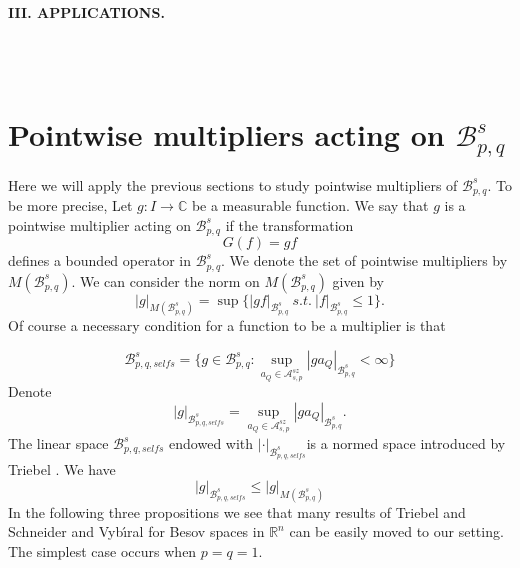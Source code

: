 \documentclass{amsart}
\theoremstyle{definition}
\begin{document}
\newpage

\centerline{ \bf III. APPLICATIONS.}
\vspace{1cm}

\fcolorbox{black}{white}{
\begin{minipage}{\textwidth}
\noindent   In Part III. we  suppose that $0< s<1/p$, $p\in [1,\infty)$ and $q\in [1,\infty]$. \end{minipage} 
}
\ \\ \\

 
\section{Pointwise multipliers acting on $\mathcal{B}^s_{p,q}$}

Here we will apply the previous sections to study pointwise multipliers of $\mathcal{B}^s_{p,q}$. To be more precise, Let $g\colon I \rightarrow \mathbb{C}$ be a measurable function. We say that $g$ is  a pointwise multiplier acting on $\mathcal{B}^s_{p,q}$ if  the transformation
$$G(f)=gf$$
defines  a bounded operator in $\mathcal{B}^s_{p,q}$. We denote the set of pointwise multipliers by $M(\mathcal{B}^s_{p,q})$. We can consider the norm on $M(\mathcal{B}^s_{p,q})$ given by
$$|g|_{M(\mathcal{B}^s_{p,q})}=\sup\{|gf|_{\mathcal{B}^s_{p,q}}\ s.t. \ |f|_{\mathcal{B}^s_{p,q}}\leq 1    \}.$$
Of course a necessary condition for  a function to be a multiplier is that 

$$\mathcal{B}^s_{p,q,selfs}=\{ g\in \mathcal{B}^s_{p,q}\colon \sup_{a_Q \in \mathcal{A}^{sz}_{s,p}} |ga_Q|_{\mathcal{B}^s_{p,q}} < \infty\}$$ 
Denote
$$|g|_{\mathcal{B}^s_{p,q,selfs}}=\sup_{a_Q \in \mathcal{A}^{sz}_{s,p}} |ga_Q|_{\mathcal{B}^s_{p,q}}.$$      
The linear space $\mathcal{B}^s_{p,q,selfs}$ endowed with $|\cdot|_{\mathcal{B}^s_{p,q,selfs}}$is a normed space introduced by  Triebel \cite{ns}. We have 
$$|g|_{\mathcal{B}^s_{p,q,selfs}}\leq |g|_{M(\mathcal{B}^s_{p,q})}$$ 
In the following three propositions we see that  many results of  Triebel \cite{ns}   and  Schneider and Vyb\'\i{ral}  \cite{corjan} for  Besov spaces in $\mathbb{R}^n$ can be easily moved to our setting. The simplest  case  occurs when $p=q=1$.
\end{document}
